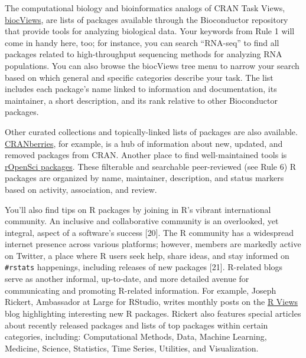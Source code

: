 \documentclass[10pt,letterpaper]{article}
\begin{document}
The computational biology and bioinformatics analogs of CRAN Task Views,
\href{https://www.bioconductor.org/packages/release/BiocViews.html\#___Software}{biocViews},
are lists of packages available through the Bioconductor repository that
provide tools for analyzing biological data. Your keywords from Rule 1
will come in handy here, too; for instance, you can search ``RNA-seq''
to find all packages related to high-throughput sequencing methods for
analyzing RNA populations. You can also browse the biocViews tree menu
to narrow your search based on which general and specific categories
describe your task. The list includes each package's name linked to
information and documentation, its maintainer, a short description, and
its rank relative to other Bioconductor packages.

Other curated collections and topically-linked lists of packages are
also available.
\href{http://dirk.eddelbuettel.com/cranberries/index.html}{CRANberries},
for example, is a hub of information about new, updated, and removed
packages from CRAN. Another place to find well-maintained tools is
\href{https://ropensci.org/packages/}{rOpenSci packages}. These
filterable and searchable peer-reviewed (see Rule 6) R packages are
organized by name, maintainer, description, and status markers based on
activity, association, and review.

You'll also find tips on R packages by joining in R's vibrant
international community. An inclusive and collaborative community is an
overlooked, yet integral, aspect of a software's success {[}20{]}. The R
community has a widespread internet presence across various platforms;
however, members are markedly active on Twitter, a place where R users
seek help, share ideas, and stay informed on \texttt{\#rstats}
happenings, including releases of new packages {[}21{]}. R-related blogs
serve as another informal, up-to-date, and more detailed avenue for
communicating and promoting R-related information. For example, Joseph
Rickert, Ambassador at Large for RStudio, writes monthly posts on the
\href{https://rviews.rstudio.com/}{R Views} blog highlighting
interesting new R packages. Rickert also features special articles about
recently released packages and lists of top packages within certain
categories, including: Computational Methods, Data, Machine Learning,
Medicine, Science, Statistics, Time Series, Utilities, and
Visualization.
\end{document}
